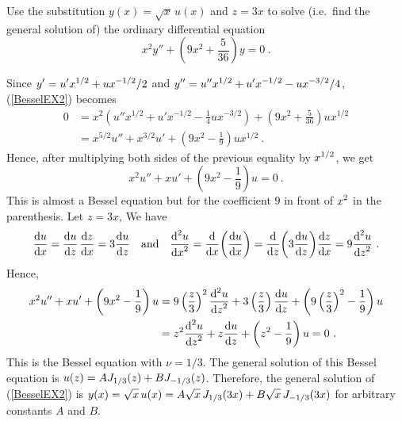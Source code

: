 \begin{egg}
Use the substitution $y(x)=\sqrt{x}\, u(x)$ and $z=3x$ to solve
(i.e.\ find the general solution of) the ordinary differential equation
\begin{equation}\label{BesselEX2}
x^2 y''+ \left( 9x^2 + \frac{5}{36}\right) y = 0 \ .
\end{equation}

Since
$\DS y'= u' x^{1/2}+ u  x^{-1/2}/2$ and
$\DS y''= u'' x^{1/2}+ u' x^{-1/2} - u x^{-3/2}/4$,
(\ref{BesselEX2}) becomes
\begin{align*}
0 &= x^2 \left(u'' x^{1/2}+ u' x^{-1/2} - \frac{1}{4} u x^{-3/2}\right)
+\left(9x^2 + \frac{5}{36}\right) u x^{1/2} \\
&= x^{5/2} u'' + x^{3/2} u' + \left( 9  x^2 - \frac{1}{9}\right) u x^{1/2} \ .
\end{align*}
Hence, after multiplying both sides of the previous equality by
$\DS x^{1/2}$, we get
\[
x^2 u'' + x u' + \left( 9  x^2 - \frac{1}{9}\right) u =0 \ .
\]
This is almost a Bessel equation but for the coefficient $9$ in front
of $\DS x^2$ in the parenthesis.  Let $z=3x$,  We have
\[
\dydx{u}{x} = \dydx{u}{z}\,\dydx{z}{x} = 3 \dydx{u}{z}
\quad \text{and} \quad
\dydxn{u}{x}{2} = \dfdx{\left( \dydx{u}{x} \right)}{x}
= \dfdx{\left( 3 \dydx{u}{z} \right)}{z} \dydx{z}{x} = 9 \dydxn{u}{z}{2} \ .
\]
Hence,
\begin{align*}
x^2 u'' + x u' + \left( 9 x^2 - \frac{1}{9}\right) u
&= 9 \left(\frac{z}{3}\right)^2\dydxn{u}{z}{2}
+ 3\left( \frac{z}{3}\right) \dydx{u}{z}
+ \left( 9 \left( \frac{z}{3}\right)^2 - \frac{1}{9}\right) u \\
&= z^2  \dydxn{u}{z}{2}
+ z \dydx{u}{z} + \left(z^2 - \frac{1}{9}\right) u =0 \ .
\end{align*}
This is the Bessel equation with $\nu = 1/3$.
The general solution of this Bessel equation is
$\DS u(z) = A J_{1/3}(z) + B J_{-1/3}(z)$.  Therefore, the
general solution of (\ref{BesselEX2}) is
$\DS y(x) = \sqrt{x} \, u(x) =
A \sqrt{x}\, J_{1/3}(3x)+ B \sqrt{x}\, J_{-1/3}(3x)$
for arbitrary constants $A$ and $B$.
\end{egg}

